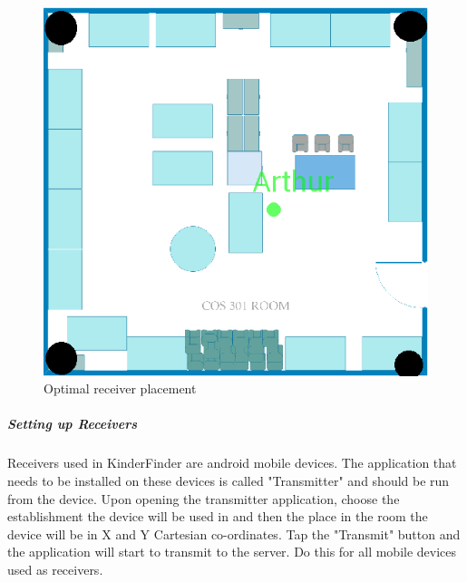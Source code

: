 \documentclass{article}
\begin{document}
\begin{figure}[H]
\centering
\includegraphics[scale=0.6]{pic1.png}
\caption{Optimal receiver placement}
\end{figure}

\subparagraph{Setting up Receivers}
Receivers used in KinderFinder are android mobile devices. The application that needs to be installed on these devices is called "Transmitter" and should be run from the device. Upon opening the transmitter application, choose the establishment the device will be used in and then the place in the room the device will be in X and Y Cartesian co-ordinates. Tap the "Transmit" button and the application will start to transmit to the server. Do this for all mobile devices used as receivers. 
\end{document}
